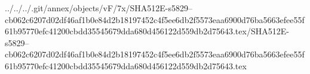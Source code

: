 ../../../.git/annex/objects/vF/7x/SHA512E-s5829--cb062c6207d02df46af1b0e84d2b18197452c4f5ee6db2f5573eaa6900d76ba5663efee55f61b95770efc41200cbdd35545679dda680d456122d559db2d75643.tex/SHA512E-s5829--cb062c6207d02df46af1b0e84d2b18197452c4f5ee6db2f5573eaa6900d76ba5663efee55f61b95770efc41200cbdd35545679dda680d456122d559db2d75643.tex